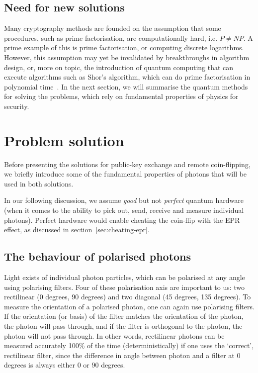\documentclass[oneside,a4paper]{article}
\begin{document}
\subsection{Need for new solutions}
Many cryptography methods are founded on the assumption that some procedures, such as prime factorisation, are computationally hard, i.e. $P \neq NP$.
A prime example of this is prime factorisation, or computing discrete logarithms.
However, this assumption may yet be invalidated by breakthroughs in algorithm design, or, more on topic, the introduction of quantum computing that can execute algorithms such as Shor's algorithm, which can do prime factorisation in polynomial time~\cite{bernstein2017post}.
In the next section, we will summarise the quantum methods for solving the problems, which rely on fundamental properties of physics for security.

\section{Problem solution}
Before presenting the solutions for public-key exchange and remote coin-flipping, we briefly introduce some of the fundamental properties of photons that will be used in both solutions.

In our following discussion, we assume \emph{good} but not \emph{perfect} quantum hardware (when it comes to the ability to pick out, send, receive and measure individual photons).
Perfect hardware would enable cheating the coin-flip with the EPR effect, as discussed in section~\ref{sec:cheating-epr}.

\subsection{The behaviour of polarised photons}
Light exists of individual photon particles, which can be polarised at any angle using polarising filters.
Four of these polarisation axis are important to us: two rectilinear (0 degrees, 90 degrees) and two diagonal (45 degrees, 135 degrees).
To measure the orientation of a polarised photon, one can again use polarising filters.
If the orientation (or basis) of the filter matches the orientation of the photon, the photon will pass through, and if the filter is orthogonal to the photon, the photon will not pass through.
In other words, rectilinear photons can be measured accurately 100\% of the time (deterministically) if one uses the `correct', rectilinear filter, since the difference in angle between photon and a filter at 0 degrees is always either 0 or 90 degrees.
\end{document}
